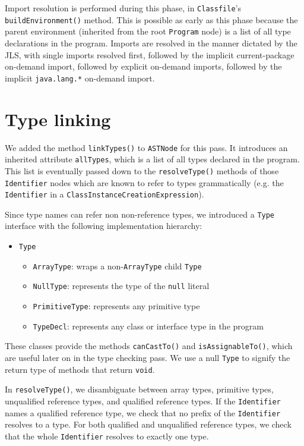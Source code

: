 \documentclass[12pt]{article}
\newcommand{\code}[1]{\texttt{#1}}
\begin{document}
Import resolution is performed during this phase, in \code{Classfile}'s \code{buildEnvironment()} method.  This is possible as early as this phase because the parent environment (inherited from the root \code{Program} node) is a list of all type declarations in the program.  Imports are resolved in the manner dictated by the JLS, with single imports resolved first, followed by the implicit current-package on-demand import, followed by explicit on-demand imports, followed by the implicit \code{java.lang.*} on-demand import.

\section{Type linking}

We added the method \code{linkTypes()} to \code{ASTNode} for this pass.  It introduces an inherited attribute \code{allTypes}, which is a list of all types declared in the program.  This list is eventually passed down to the \code{resolveType()} methods of those \code{Identifier} nodes which are known to refer to types grammatically (e.g. the \code{Identifier} in a \code{ClassInstanceCreationExpression}).

Since type names can refer non non-reference types, we introduced a \code{Type} interface with the following implementation hierarchy:

\begin{itemize}
\item \code{Type}
\begin{itemize}
\item \code{ArrayType}: wraps a non-\code{ArrayType} child \code{Type}
\item \code{NullType}: represents the type of the \code{null} literal
\item \code{PrimitiveType}: represents any primitive type
\item \code{TypeDecl}: represents any class or interface type in the program
\end{itemize}
\end{itemize}

These classes provide the methods \code{canCastTo()} and \code{isAssignableTo()}, which are useful later on in the type checking pass. We use a null \code{Type} to signify the return type of methods that return \code{void}.

In \code{resolveType()}, we disambiguate between array types, primitive types, unqualified reference types, and qualified reference types.  If the \code{Identifier} names a qualified reference type, we check that no prefix of the \code{Identifier} resolves to a type.  For both qualified and unqualified reference types, we check that the whole \code{Identifier} resolves to exactly one type.
\end{document}
